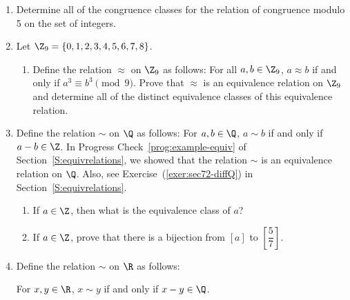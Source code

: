 \begin{enumerate}
\item Determine all of the congruence classes for the relation of congruence modulo  5  on the set of integers. \label{exer:sec73-congclass}

\item Let $\Z_{9} = \left\{ 0, 1, 2, 3, 4, 5, 6, 7, 8 \right\}$.  \label{exer:modpowers}
\begin{enumerate}
\yitem Define the relation $\sim$ on $\Z_{9}$ as follows:  For all $a, b \in \Z_{9}$, $a \sim b$ if and only if $a^2 \equiv b^2 \pmod {9}$.  Prove that $\sim$ is an equivalence relation on 
$\Z_{9}$ and determine all of the distinct equivalence classes of this equivalence relation.

\item Define the relation $\approx$ on $\Z_{9}$ as follows:  For all $a, b \in \Z_{9}$, 
$a \approx b$ if and only if $a^3 \equiv b^3 \pmod {9}$.  Prove that $\approx$ is an equivalence relation on $\Z_{9}$ and determine all of the distinct equivalence classes of this equivalence relation.
\end{enumerate}

\item \label{exer:sec73-integer} Define the relation $\sim$ on $\Q$ as follows:  For $a, b \in \Q$, $a \sim b$ if and only if $a - b \in \Z$. \label{exer:sec72-integer}  In Progress Check~\ref{prog:example-equiv} of Section~\ref{S:equivrelations}, we showed that the relation $\sim$ is an equivalence relation on $\Q$.  Also, see Exercise~(\ref{exer:sec72-diffQ}) in Section~\ref{S:equivrelations}.

\begin{enumerate}
\yitem Prove that $\left[ \dfrac{5}{7} \right] = \left\{ \left. m + \dfrac{5}{7} \right| m \in \Z \right\}$.

\item If $a \in \Z$, then what is the equivalence class of $a$?

\item If $a \in \Z$, prove that there is a bijection from $\left[ a \right]$ to 
$\left[ \dfrac{5}{7} \right]$. 
\end{enumerate}

\item Define the relation $\sim$ on $\R$ as follows:
\label{exer:sec73-rationaldiff}%

\begin{center}
For $x, y \in \R$, $x \sim y$ if and only if $x - y \in \Q$.
\end{center}


\end{enumerate}
